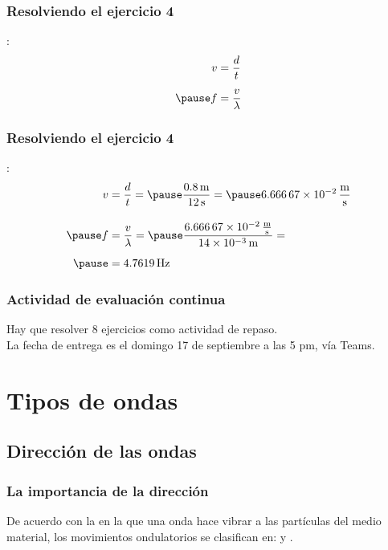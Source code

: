 \documentclass[14pt]{beamer}
\begin{document}
\begin{frame}
\frametitle{Resolviendo el ejercicio 4}
:
\begin{eqnarray*}
\begin{aligned}
v &= \dfrac{d}{t} \\[0.5em] \pause
f &= \dfrac{v}{\lambda}
\end{aligned}
\end{eqnarray*}
\end{frame}
\begin{frame}
\frametitle{Resolviendo el ejercicio 4}
:
\begin{eqnarray*}
\begin{aligned}
v &= \dfrac{d}{t} = \pause \dfrac{\SI{0.8}{\meter}}{\SI{12}{\second}} = \pause \SI[per-mode=fraction]{6.66667d-2}{\meter\per\second} \\[1em] \pause
f &= \dfrac{v}{\lambda} = \pause \dfrac{\SI[per-mode=fraction]{6.66667d-2}{\meter\per\second}}{\SI{14d-3}{\meter}} = \\[0.5em] \pause
&= \SI{4.7619}{\hertz}
\end{aligned}
\end{eqnarray*}
\end{frame}
\begin{frame}
\frametitle{Actividad de evaluación continua}
Hay que resolver $8$ ejercicios como actividad de repaso.
\\
\bigskip
\pause
La fecha de entrega es el domingo 17 de septiembre a las 5 pm, vía Teams.
\end{frame}

\section{Tipos de ondas}
\subsection{Dirección de las ondas}

\begin{frame}
\frametitle{La importancia de la dirección}
De acuerdo con la  en la que una onda hace vibrar a las partículas del medio material, \pause los movimientos ondulatorios se clasifican en:  \pause y .
\end{frame}
\end{document}
